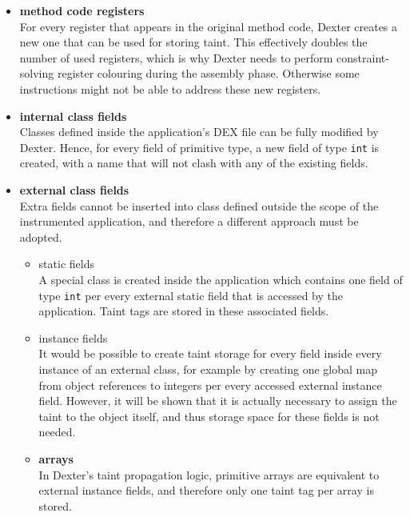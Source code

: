 \documentclass[12pt,twoside,notitlepage]{report}
\begin{document}
\begin{itemize}

\item \textbf{method code registers} \\
For every register that appears in the original method code, Dexter creates a new one that can be used for storing taint. This effectively doubles the number of used registers, which is why Dexter needs to perform constraint-solving register colouring during the assembly phase. Otherwise some instructions might not be able to address these new registers.

\item \textbf{internal class fields} \\
Classes defined inside the application's DEX file can be fully modified by Dexter. Hence, for every field of primitive type, a new field of type \verb$int$ is created, with a name that will not clash with any of the existing fields.

\item \textbf{external class fields} \\
Extra fields cannot be inserted into class defined outside the scope of the instrumented application, and therefore a different approach must be adopted. 
\begin{itemize}
\item static fields \\
A special class is created inside the application which contains one field of type \verb$int$ per every external static field that is accessed by the application. Taint tags are stored in these associated fields.

\item instance fields \\
It would be possible to create taint storage for every field inside every instance of an external class, for example by creating one global map from object references to integers per every accessed external instance field. However, it will be shown that it is actually necessary to assign the taint to the object itself, and thus storage space for these fields is not needed.

\item \textbf{arrays} \\
In Dexter's taint propagation logic, primitive arrays are equivalent to external instance fields, and therefore only one taint tag per array is stored.

\end{itemize}

\end{itemize}
\end{document}
